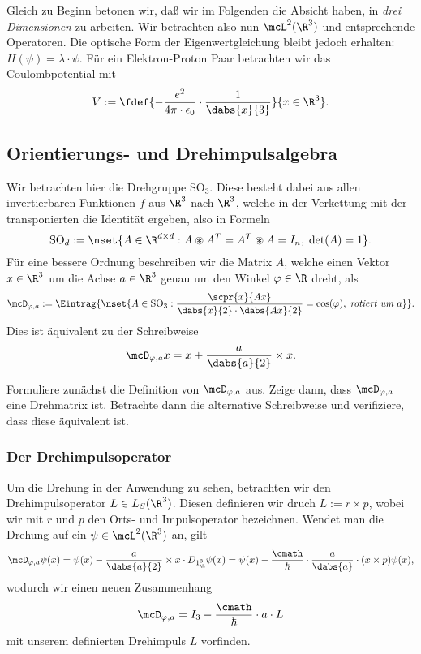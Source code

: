 \documentclass{subfiles}
\begin{document}
    Gleich zu Beginn betonen wir, daß wir im Folgenden die Absicht haben, in \emph{drei Dimensionen} zu arbeiten. Wir betrachten also nun $\mcL^2(\R^3)$ und entsprechende Operatoren. Die optische Form der Eigenwertgleichung bleibt jedoch erhalten: $H(\psi) = \lambda\cdot\psi$. Für ein Elektron-Proton Paar betrachten wir das Coulombpotential mit
    \[V := \fdef{-\frac{e^2}{4\pi\cdot\epsilon_0}\cdot\frac{1}{\dabs{x}{3}}}{x\in\R^3}.\]
    \subsection{Orientierungs- und Drehimpulsalgebra}
    Wir betrachten hier die Drehgruppe $\text{SO}_3$. Diese besteht dabei aus allen invertierbaren Funktionen $f$ aus $\R^3$ nach $\R^3$, welche in der Verkettung mit der transponierten die Identität ergeben, also in Formeln
    \[\text{SO}_d:=\nset{A\in\R^{d\times d}:A\circledast A^T = A^T\circledast A = I_n,\;\det(A)=1}.\]
    Für eine bessere Ordnung beschreiben wir die Matrix $A$, welche einen Vektor $x\in\R^3$ um die Achse $a\in\R^3$ genau um den Winkel $\varphi\in\R$ dreht, als
    \[\mcD_{\varphi,a}:=\Eintrag{\nset{A\in\text{SO}_3:\frac{\scpr{x}{Ax}}{\dabs{x}{2}\cdot\dabs{Ax}{2}} = \cos(\varphi),\;\textit{rotiert um }a}}.\]
    Dies ist äquivalent zu der Schreibweise
    \[\mcD_{\varphi,a}x = x+\frac{a}{\dabs{a}{2}}\times x.\]
    \begin{Aufgabe}
        \nr{} Formuliere zunächst die Definition von $\mcD_{\varphi,a}$ aus. Zeige dann, dass $\mcD_{\varphi,a}$ eine Drehmatrix ist. Betrachte dann die alternative Schreibweise und verifiziere, dass diese äquivalent ist.
    \end{Aufgabe}

    \subsubsection*{Der Drehimpulsoperator}
        Um die Drehung in der Anwendung zu sehen, betrachten wir den Drehimpulsoperator $L\in L_S(\R^3)$. Diesen definieren wir druch $L:=r\times p$, wobei wir mit $r$ und $p$ den Orts- und Impulsoperator bezeichnen. Wendet man die Drehung auf ein $\psi\in\mcL^2(\R^3)$ an, gilt
        \[\mcD_{\varphi,a}\psi(x) = \psi(x) - \frac{a}{\dabs{a}{2}}\times x\cdot D_{1_\R^3}\psi(x) = \psi(x) - \frac{\cmath}{\hbar}\cdot\frac{a}{\dabs{a}}\cdot(x\times p)\psi(x),\]
        wodurch wir einen neuen Zusammenhang
        \[\mcD_{\varphi,a} = I_3 - \frac{\cmath}{\hbar}\cdot a\cdot L\]
        mit unserem definierten Drehimpuls $L$ vorfinden. 
\end{document}
